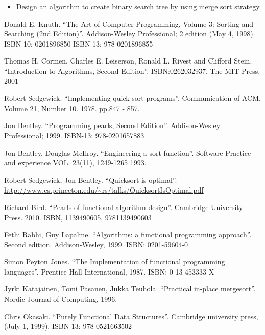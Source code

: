 \documentclass[b5paper]{article}
\begin{document}
\begin{Exercise}
  \begin{itemize}
    \item Design an algorithm to create binary search tree by using merge sort strategy.
  \end{itemize}
\end{Exercise}

\ifx\wholebook\relax\else

\begin{thebibliography}{99}

Donald E. Knuth. ``The Art of Computer Programming, Volume 3: Sorting and Searching (2nd Edition)''. Addison-Wesley Professional; 2 edition (May 4, 1998) ISBN-10: 0201896850 ISBN-13: 978-0201896855

Thomas H. Cormen, Charles E. Leiserson, Ronald L. Rivest and Clifford Stein.
``Introduction to Algorithms, Second Edition''. ISBN:0262032937. The MIT Press. 2001

Robert Sedgewick. ``Implementing quick sort programs''. Communication of ACM. Volume 21, Number 10. 1978. pp.847 - 857.

Jon Bentley. ``Programming pearls, Second Edition''. Addison-Wesley Professional; 1999. ISBN-13: 978-0201657883

Jon Bentley, Douglas McIlroy. ``Engineering a sort function''. Software Practice and experience VOL. 23(11), 1249-1265 1993.

Robert Sedgewick, Jon Bentley. ``Quicksort is optimal''. \url{http://www.cs.princeton.edu/~rs/talks/QuicksortIsOptimal.pdf}

Richard Bird. ``Pearls of functional algorithm design''. Cambridge University Press. 2010. ISBN, 1139490605, 9781139490603

Fethi Rabhi, Guy Lapalme. ``Algorithms: a functional programming approach''. Second edition. Addison-Wesley, 1999. ISBN: 0201-59604-0

Simon Peyton Jones. ``The Implementation of functional programming languages''. Prentice-Hall International, 1987. ISBN: 0-13-453333-X

Jyrki Katajainen, Tomi Pasanen, Jukka Teuhola. ``Practical in-place mergesort''. Nordic Journal of Computing, 1996.

Chris Okasaki. ``Purely Functional Data Structures''. Cambridge university press, (July 1, 1999), ISBN-13: 978-0521663502


\end{thebibliography}
\end{document}
